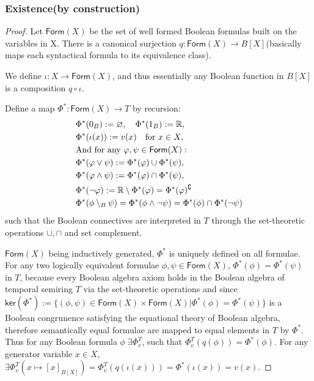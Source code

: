 \subsubsection*{Existence(by construction)}
\begin{proof}
Let $\mathsf{Form}(X)$ be the set of well formed Boolean formulas built on the variables in X. There is a canonical surjection 
$q:\mathsf{Form}(X)\rightarrow B[X]$(basically maps each syntactical formula to its equivalence class).

We define $\iota: X \rightarrow \mathsf{Form}(X)$, and thus essentially any Boolean function in $B[X]$ is a composition $q\circ \iota$.

Define a map $\Phi^*:\mathsf{Form}(X)\rightarrow T$ by recursion:
\begin{align*}
&\Phi^*(0_B) := \varnothing,\quad\Phi^*(1_B) := \mathbb{R},\\
&\Phi^*(\iota(x)) := v(x)\quad\text{for }x\in X,\\
\vspace{2cm}
&\text{And for any }\varphi,\psi \in \mathsf{Form}(X):\\
&\Phi^*(\varphi\vee\psi) := \Phi^*(\varphi)\cup\Phi^*(\psi),\\
&\Phi^*(\varphi\wedge\psi) := \Phi^*(\varphi)\cap\Phi^*(\psi),\\
&\Phi^*(\neg\varphi) := \mathbb{R}\setminus\Phi^*(\varphi)= \Phi^*(\varphi)^\complement\\
&\Phi^*(\phi \setminus_B \psi) = \Phi^*(\phi \wedge \neg \psi) = \Phi^*(\phi)\cap \Phi^*(\neg \psi)
\end{align*}
such that the Boolean connectives are interpreted in $T$ through the set-theoretic operations $\cup, \cap$ and set complement.

$\mathsf{Form}(X)$ being inductively generated, $\Phi^*$ is uniquely defined on all formulae.
  For any two logically equivalent formulae $\phi, \psi \in \mathsf{Form}(X)$, $\Phi^*(\phi)=\Phi^*(\psi)$ in $T$, because every Boolean algebra axiom holds in 
  the Boolean algebra of temporal semiring $T$ via the set-theoretic operations and since
  $\mathsf{ker}(\Phi^*):=\{(\phi,\psi)\in \mathsf{Form}(X)\times \mathsf{Form}(X)|\Phi^*(\phi)=\Phi^*(\psi)\}$ is a Boolean congrunence satisfying the equational theory of Boolean algebra, 
  therefore semantically equal formulae are mapped to equal elements in $T$ by $\Phi^*$.
  Thus for any Boolean formula $\phi\;\exists \Phi_v^T$, such that $\Phi_v^T(q(\phi))=\Phi^*(\phi)$.
  For any generator variable $x \in X$, $\exists\Phi_v^T(x\mapsto [x]_{B[X]})=\Phi_v^T(q(\iota(x)))=\Phi^*(\iota(x))=v(x)$.

\end{proof}

